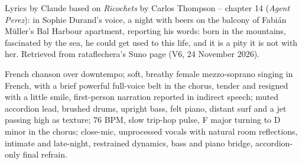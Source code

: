 
\begin{notes}
Lyrics by Claude based on \emph{Ricochets} by Carlos Thompson -- chapter 14 (\emph{Agent Perez}): in Sophie Durand's voice, a night with beers on the balcony of Fabián Müller's Bal Harbour apartment, reporting his words: born in the mountains, fascinated by the sea, he could get used to this life, and it is a pity it is not with her. Retrieved from rataflechera's Suno page (V6, 24 November 2026).
\end{notes}
\begin{style}
French chanson over downtempo; soft, breathy female mezzo-soprano singing in French, with a brief powerful full-voice belt in the chorus, tender and resigned with a little smile, first-person narration reported in indirect speech; muted accordion lead, brushed drums, upright bass, felt piano, distant surf and a jet passing high as texture; 76 BPM, slow trip-hop pulse, F major turning to D minor in the chorus; close-mic, unprocessed vocals with natural room reflections, intimate and late-night, restrained dynamics, bass and piano bridge, accordion-only final refrain.
\end{style}
